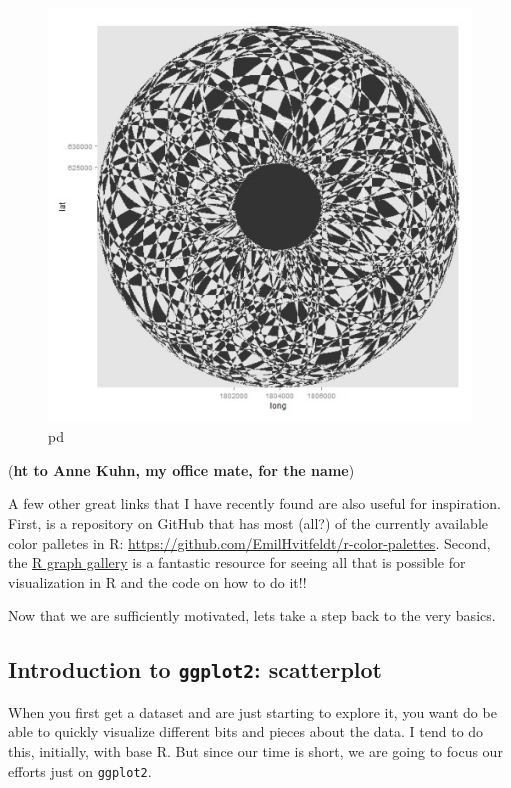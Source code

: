 \documentclass[]{article}
\begin{document}
\begin{figure}
\centering
\includegraphics{figures/tumblr_nbfye5hrjR1smu039o1_500.jpg}
\caption{pd}
\end{figure}

(\textbf{ht to Anne Kuhn, my office mate, for the name})

A few other great links that I have recently found are also useful for
inspiration. First, is a repository on GitHub that has most (all?) of
the currently available color palletes in R:
\url{https://github.com/EmilHvitfeldt/r-color-palettes}. Second, the
\href{https://www.r-graph-gallery.com/}{R graph gallery} is a fantastic
resource for seeing all that is possible for visualization in R and the
code on how to do it!!

Now that we are sufficiently motivated, lets take a step back to the
very basics.

\hypertarget{introduction-to-ggplot2-scatterplot}{%
\subsection{\texorpdfstring{Introduction to \texttt{ggplot2}:
scatterplot}{Introduction to ggplot2: scatterplot}}\label{introduction-to-ggplot2-scatterplot}}

When you first get a dataset and are just starting to explore it, you
want do be able to quickly visualize different bits and pieces about the
data. I tend to do this, initially, with base R. But since our time is
short, we are going to focus our efforts just on \texttt{ggplot2}.
\end{document}
